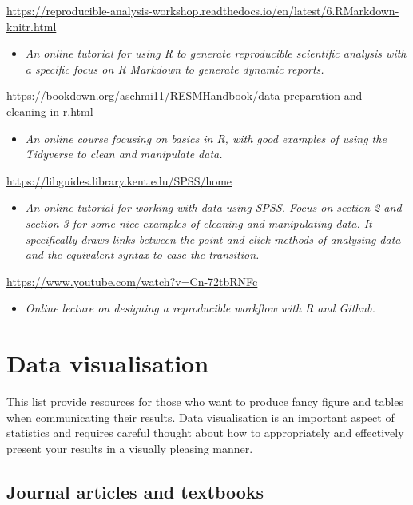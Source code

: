 \documentclass[
]{book}
\providecommand{\tightlist}{%
  \setlength{\itemsep}{0pt}\setlength{\parskip}{0pt}}
\begin{document}
\url{https://reproducible-analysis-workshop.readthedocs.io/en/latest/6.RMarkdown-knitr.html}

\begin{itemize}
\tightlist
\item
  \emph{An online tutorial for using R to generate reproducible scientific analysis with a specific focus on R Markdown to generate dynamic reports.}
\end{itemize}

\url{https://bookdown.org/aschmi11/RESMHandbook/data-preparation-and-cleaning-in-r.html}

\begin{itemize}
\tightlist
\item
  \emph{An online course focusing on basics in R, with good examples of using the Tidyverse to clean and manipulate data.}
\end{itemize}

\url{https://libguides.library.kent.edu/SPSS/home}

\begin{itemize}
\tightlist
\item
  \emph{An online tutorial for working with data using SPSS. Focus on section 2 and section 3 for some nice examples of cleaning and manipulating data. It specifically draws links between the point-and-click methods of analysing data and the equivalent syntax to ease the transition.}
\end{itemize}

\url{https://www.youtube.com/watch?v=Cn-72tbRNFc}

\begin{itemize}
\tightlist
\item
  \emph{Online lecture on designing a reproducible workflow with R and Github.}
\end{itemize}

\hypertarget{data-visualisation}{%
\chapter{Data visualisation}\label{data-visualisation}}

This list provide resources for those who want to produce fancy figure and tables when communicating their results. Data visualisation is an important aspect of statistics and requires careful thought about how to appropriately and effectively present your results in a visually pleasing manner.

\hypertarget{journal-articles-and-textbooks-1}{%
\section{Journal articles and textbooks}\label{journal-articles-and-textbooks-1}}
\end{document}

